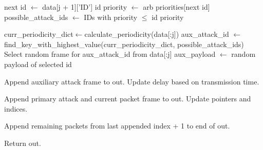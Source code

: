 \documentclass{article}
\begin{document}
\begin{algorithm}
\begin{algorithmic}[1]
                        \State next id $\gets$ data[j + 1]['ID']
                        \State id priority $\gets$ arb priorities[next id]
                        \State possible\_attack\_ids $\gets$ IDs with priority $\leq$ id priority
    
                            \State curr\_periodicity\_dict$\gets$calculate\_periodicity(data[:j])
                            \State aux\_attack\_id $\gets$ find\_key\_with\_highest\_value(curr\_periodicity\_dict, \State \hspace{100pt} possible\_attack\_ids)
                            \State Select random frame for aux\_attack\_id from data[:j]
                            \State aux\_payload $\gets$ random payload of selected id
                             
                            
                            \State Append auxiliary attack frame to out.
                            \State Update delay based on transmission time.
                            
                        \EndIf
                    \EndFor
    
                    \State Append primary attack and current packet frame to out.
                    \State Update pointers and indices.
                \EndIf
            \EndIf
        \EndIf
    \EndFor
    
    Append remaining packets from last appended index + 1 to end of out.
    
    Return out.
    \EndProcedure
    
    
    \end{algorithmic}
    \end{algorithm}
    
\end{document}
